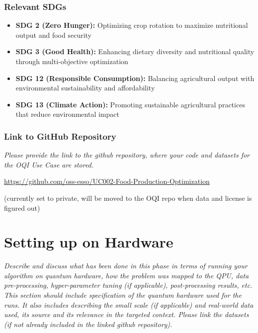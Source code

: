 \documentclass{oqireport}
\begin{document}
\subsubsection*{Relevant SDGs}
\begin{itemize}
    \item \textbf{SDG 2 (Zero Hunger):} Optimizing crop rotation to maximize nutritional output and food security
    \item \textbf{SDG 3 (Good Health):} Enhancing dietary diversity and nutritional quality through multi-objective optimization
    \item \textbf{SDG 12 (Responsible Consumption):} Balancing agricultural output with environmental sustainability and affordability
    \item \textbf{SDG 13 (Climate Action):} Promoting sustainable agricultural practices that reduce environmental impact
\end{itemize}

\subsubsection*{Link to GitHub Repository}
    \textit{Please provide the link to the github repository, where your code and datasets for the OQI Use Case are stored.}
    \par
   \url{https://github.com/oss-esso/UC002-Food-Production-Optimization}
   \par
   (currently set to private, will be moved to the OQI repo when data and license is figured out)





\section{Setting up on Hardware}

\textit{
Describe and discuss what has been done in this phase in terms of running your algorithm on quantum hardware, how the problem was mapped to the QPU, data pre-processing, hyper-parameter tuning (if applicable), post-processing results, etc.
This section should include specification of the quantum hardware used for the runs. 
It also includes describing the small scale (if applicable) and  real-world data used, its source and its relevance in the targeted context. Please link the datasets (if not already included in the linked github repository).
}
\end{document}
